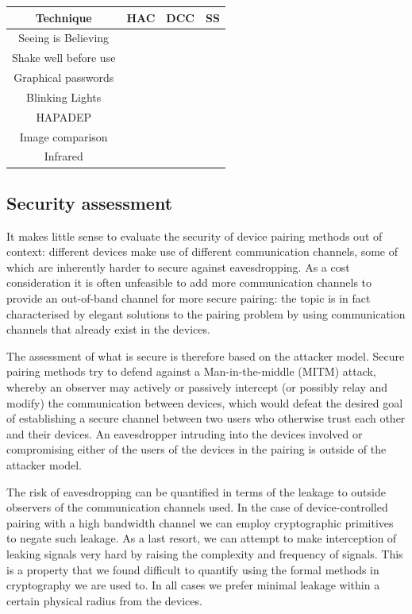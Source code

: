 \documentclass[conference, 11pt]{sty/IEEEtran}
\begin{document}
\begin{tabular}{c|c|c|c}
	Technique & HAC & DCC & SS \\
	\hline
	  Seeing is Believing &  & \checkmark &   \\
	Shake well before use &  &  & \checkmark \\
    	  Graphical passwords & \checkmark &  &  \\
	   Blinking Lights & \checkmark &  & \\
	 HAPADEP &  & \checkmark & \checkmark \\
	Image comparison & \checkmark &  & \\
	Infrared &  & \checkmark &  \\
\end{tabular}

\subsection{Security assessment}
\label{ssec:security_assessment}

It makes little sense to evaluate the security of device pairing methods out of context: different devices make use of different communication channels, some of which are inherently harder to secure against eavesdropping.
As a cost consideration it is often unfeasible to add more communication channels to provide an out-of-band channel for more secure pairing: the topic is in fact characterised by elegant solutions to the pairing problem by using communication channels that already exist in the devices.

The assessment of what is secure is therefore based on the attacker model.
Secure pairing methods try to defend against a Man-in-the-middle (MITM) attack, whereby an observer may actively or passively intercept (or possibly relay and modify) the communication between devices, which would defeat the desired goal of establishing a secure channel between two users who otherwise trust each other and their devices.
An eavesdropper intruding into the devices involved or compromising either of the users of the devices in the pairing is outside of the attacker model.

The risk of eavesdropping can be quantified in terms of the leakage to outside observers of the communication channels used.
In the case of device-controlled pairing with a high bandwidth channel we can employ cryptographic primitives to negate such leakage.
As a last resort, we can attempt to make interception of leaking signals very hard by raising the complexity and frequency of signals.
This is a property that we found difficult to quantify using the formal methods in cryptography we are used to.
In all cases we prefer minimal leakage within a certain physical radius from the devices.
\end{document}
